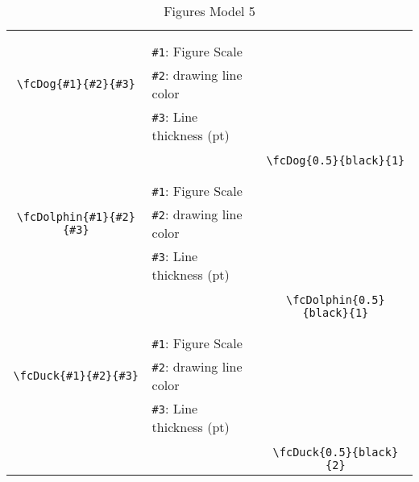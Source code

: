 \documentclass[x11names]{article}
\begin{document}
\begin{table}[H]
\begin{tabular}{|c|l|c|}
	&&\multirow{5}{*}{\fcDog{0.5}{black}{1}}\\	&&\\	&\verb|#1|: Figure Scale &\\	\verb|\fcDog{#1}{#2}{#3}|&	\verb|#2|: drawing line color &\\	&\verb|#3|: Line thickness (pt) &\\ &&\\&&	\verb|\fcDog{0.5}{black}{1}|\\\hline 	
	&&\multirow{5}{*}{\fcDolphin{0.5}{black}{1}}\\	&&\\	&\verb|#1|: Figure Scale &\\	\verb|\fcDolphin{#1}{#2}{#3}|&	\verb|#2|: drawing line color &\\	&\verb|#3|: Line thickness (pt) &\\ &&\\&&	\verb|\fcDolphin{0.5}{black}{1}|\\\hline 	
	&&\multirow{5}{*}{\fcDuck{0.5}{black}{2}}\\	&&\\	&\verb|#1|: Figure Scale &\\	\verb|\fcDuck{#1}{#2}{#3}|&	\verb|#2|: drawing line color &\\	&\verb|#3|: Line thickness (pt) &\\ &&\\&&	\verb|\fcDuck{0.5}{black}{2}|\\\hline 	\hline\end{tabular}\caption{Figures Model 5}\label{tab5}\end{table}
\end{document}
